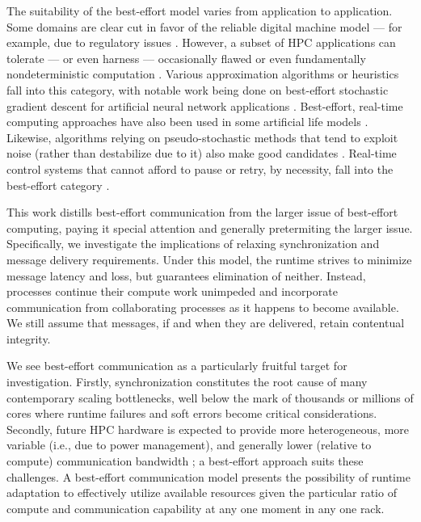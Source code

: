 The suitability of the best-effort model varies from application to application.
Some domains are clear cut in favor of the reliable digital machine model --- for example, due to regulatory issues \citep{dongarra2014applied}.
However, a subset of HPC applications can tolerate --- or even harness --- occasionally flawed or even fundamentally nondeterministic computation \citep{chakradhar2010best}.
Various approximation algorithms or heuristics fall into this category, with notable work being done on best-effort stochastic gradient descent for artificial neural network applications \citep{dean2012large,zhao2019elastic,niu2011hogwild,noel2014dogwild,rhodes2020real}.
Best-effort, real-time computing approaches have also been used in some artificial life models \citep{ray1995proposal}.
Likewise, algorithms relying on pseudo-stochastic methods that tend to exploit noise (rather than destabilize due to it) also make good candidates \citep{chakrapani2008probabilistic,chakradhar2010best}.
Real-time control systems that cannot afford to pause or retry, by necessity, fall into the best-effort category \citep{rahmati2011computing, rhodes2020real}.

This work distills best-effort communication from the larger issue of best-effort computing, paying it special attention and generally pretermiting the larger issue.
Specifically, we investigate the implications of relaxing synchronization and message delivery requirements.
Under this model, the runtime strives to minimize message latency and loss, but guarantees elimination of neither.
Instead, processes continue their compute work unimpeded and incorporate communication from collaborating processes as it happens to become available.
We still assume that messages, if and when they are delivered, retain contentual integrity.

We see best-effort communication as a particularly fruitful target for investigation.
Firstly, synchronization constitutes the root cause of many contemporary scaling bottlenecks, well below the mark of thousands or millions of cores where runtime failures and soft errors become critical considerations.
Secondly, future HPC hardware is expected to provide more heterogeneous, more variable (i.e., due to power management), and generally lower (relative to compute) communication bandwidth \citep{gropp2013programming, acun2014parallel}; a best-effort approach suits these challenges.
A best-effort communication model presents the possibility of runtime adaptation to effectively utilize available resources given the particular ratio of compute and communication capability at any one moment in any one rack.

